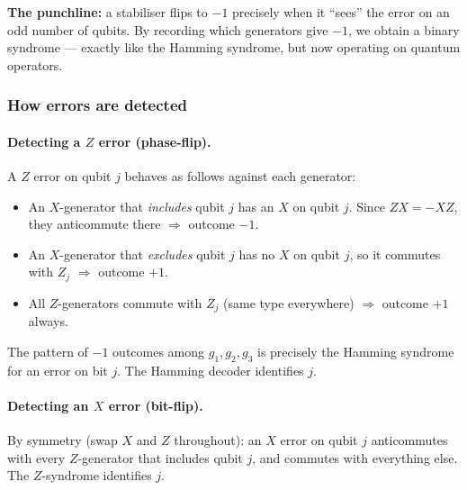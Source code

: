 \documentclass[11pt, a4paper]{article}
\theoremstyle{definition}
\theoremstyle{plain}
\theoremstyle{remark}
\begin{document}
\medskip\noindent
\textbf{The punchline:} a stabiliser flips to $-1$ precisely when
it ``sees'' the error on an odd number of qubits.  By recording which
generators give $-1$, we obtain a binary syndrome --- exactly like the
Hamming syndrome, but now operating on quantum operators.

\subsubsection{How errors are detected}

\paragraph{Detecting a $Z$ error (phase-flip).}
A $Z$ error on qubit $j$ behaves as follows against each generator:
\begin{itemize}
  \item An $X$-generator that \emph{includes} qubit $j$ has an $X$ on
        qubit $j$.  Since $ZX = -XZ$, they anticommute there
        $\Rightarrow$ outcome $-1$.
  \item An $X$-generator that \emph{excludes} qubit $j$ has no $X$
        on qubit $j$, so it commutes with $Z_j$
        $\Rightarrow$ outcome $+1$.
  \item All $Z$-generators commute with $Z_j$ (same type everywhere)
        $\Rightarrow$ outcome $+1$ always.
\end{itemize}
The pattern of $-1$ outcomes among $g_1, g_2, g_3$ is precisely the
Hamming syndrome for an error on bit $j$.  The Hamming decoder
identifies $j$.

\paragraph{Detecting an $X$ error (bit-flip).}
By symmetry (swap $X$ and $Z$ throughout): an $X$ error on qubit $j$
anticommutes with every $Z$-generator that includes qubit $j$, and
commutes with everything else.  The $Z$-syndrome identifies $j$.
\end{document}
